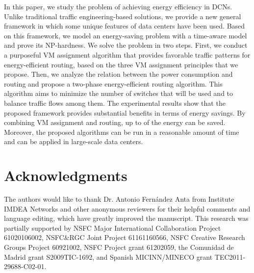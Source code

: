 \documentclass[journal,single-space,two column,twoside,10pt]{IEEEtran}
\begin{document}
In this paper, we study the problem of achieving energy efficiency in DCNs. Unlike traditional traffic engineering-based solutions, we provide a new general framework in which some unique features of data centers have been used. Based on this framework, we model an energy-saving problem with a time-aware model and prove its NP-hardness. We solve the problem in two steps. First, we conduct a purposeful VM assignment algorithm that provides favorable traffic patterns for energy-efficient routing, based on the three VM assignment principles that we propose. Then, we analyze the relation between the power consumption and routing and propose a two-phase energy-efficient routing algorithm. This algorithm aims to minimize the number of switches that will be used and to balance traffic flows among them. The experimental results show that the proposed framework provides substantial benefits in terms of energy savings. By combining VM assignment and routing, up to  of the energy can be saved. Moreover, the proposed algorithms can be run in a reasonable amount of time and can be applied in large-scale data centers.


\section*{Acknowledgments}
The authors would like to thank Dr. Antonio Fern\'andez Anta from Institute IMDEA Networks and other anonymous reviewers for their helpful comments and language editing, which have greatly improved the manuscript. This research was partially supported by NSFC Major International Collaboration Project 61020106002, NSFC\&RGC Joint Project 61161160566, NSFC Creative Research Groups Project 60921002, NSFC Project grant 61202059, the Comunidad de Madrid grant S2009TIC-1692, and Spanish MICINN/MINECO grant TEC2011-29688-C02-01. 
\end{document}
